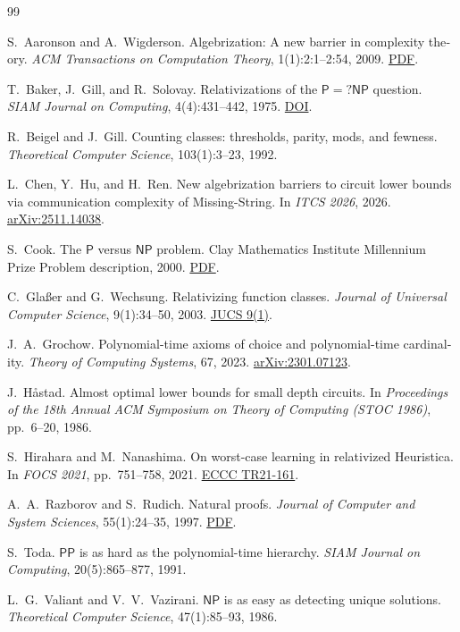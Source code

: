 \documentclass[11pt,a4paper]{article}
\theoremstyle{definition}
\theoremstyle{remark}
\newcommand{\Pcl}{\mathsf{P}}
\newcommand{\NP}{\mathsf{NP}}
\newcommand{\PP}{\mathsf{PP}}
\begin{document}
\begin{english}
\renewcommand{\refname}{References}
\begin{thebibliography}{99}

S.~Aaronson and A.~Wigderson.
Algebrization: A new barrier in complexity theory.
\emph{ACM Transactions on Computation Theory}, 1(1):2:1--2:54, 2009.
\href{https://www.scottaaronson.com/papers/alg.pdf}{PDF}.

T.~Baker, J.~Gill, and R.~Solovay.
Relativizations of the $\Pcl = ?\NP$ question.
\emph{SIAM Journal on Computing}, 4(4):431--442, 1975.
\href{https://epubs.siam.org/doi/10.1137/0204037}{DOI}.

R.~Beigel and J.~Gill.
Counting classes: thresholds, parity, mods, and fewness.
\emph{Theoretical Computer Science}, 103(1):3--23, 1992.

L.~Chen, Y.~Hu, and H.~Ren.
New algebrization barriers to circuit lower bounds via communication complexity of Missing-String.
In \emph{ITCS 2026}, 2026.
\href{https://arxiv.org/abs/2511.14038}{arXiv:2511.14038}.

S.~Cook.
The $\Pcl$ versus $\NP$ problem.
Clay Mathematics Institute Millennium Prize Problem description, 2000.
\href{https://www.claymath.org/wp-content/uploads/2022/06/pvsnp.pdf}{PDF}.

C.~Gla\ss er and G.~Wechsung.
Relativizing function classes.
\emph{Journal of Universal Computer Science}, 9(1):34--50, 2003.
\href{https://lib.jucs.org/issue/4069/}{JUCS 9(1)}.

J.~A.~Grochow.
Polynomial-time axioms of choice and polynomial-time cardinality.
\emph{Theory of Computing Systems}, 67, 2023.
\href{https://arxiv.org/abs/2301.07123}{arXiv:2301.07123}.

J.~H\aa stad.
Almost optimal lower bounds for small depth circuits.
In \emph{Proceedings of the 18th Annual ACM Symposium on Theory of Computing (STOC 1986)}, pp.~6--20, 1986.

S.~Hirahara and M.~Nanashima.
On worst-case learning in relativized Heuristica.
In \emph{FOCS 2021}, pp.~751--758, 2021.
\href{https://eccc.weizmann.ac.il/report/2021/161/download}{ECCC TR21-161}.

A.~A.~Razborov and S.~Rudich.
Natural proofs.
\emph{Journal of Computer and System Sciences}, 55(1):24--35, 1997.
\href{https://mit6875.github.io/PAPERS/natural_proofs.pdf}{PDF}.

S.~Toda.
$\PP$ is as hard as the polynomial-time hierarchy.
\emph{SIAM Journal on Computing}, 20(5):865--877, 1991.

L.~G.~Valiant and V.~V.~Vazirani.
$\NP$ is as easy as detecting unique solutions.
\emph{Theoretical Computer Science}, 47(1):85--93, 1986.

\end{thebibliography}

\end{english}
\end{document}
